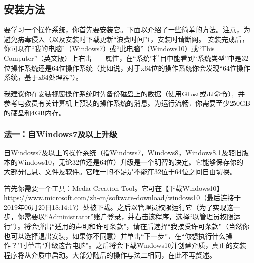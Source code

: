 \subsection{安装方法}
要学习一个操作系统，你首先要安装它。下面以介绍了一些简单的方法。注意，为避免病毒侵入（以及安装时下载更新“浪费时间”），安装时请断网。
安装完成后，你可以在“我的电脑”（Windows7）或“此电脑”（Windows10）或“This Computer”（英文版）上右击——属性，在“系统”栏目中能看到“系统类型”中是32位操作系统还是64位操作系统（比如说，对于x64位的操作系统你会发现“64位操作系统，基于x64处理器”）。
\begin{center} \bf \large {\color{red}{警告！即使使用微软提供的映像，第三方安装工具也可能会向计算机注入病毒或安装用户不需要的软件！因此请尽量不要使用非官方的工具来安装系统！}}\end{center}\par
我建议你在安装视窗操作系统时先备份磁盘上的数据（使用Ghost或dd命令），并参考电教员有关计算机上预装的操作系统的消息。为运行流畅，你需要至少250GB的硬盘和4GB内存。
\subsubsection{法一：自Windows7及以上升级}
自Windows7及以上的操作系统（指Windows7，Windows8，Windows8.1及较旧版本的Windows10，无论32位还是64位）升级是一个明智的决定。它能够保存你的大部分信息、文件及软件。它唯一的不足是不能在32位于64位之间自由切换。\par
首先你需要一个工具：Media Creation Tool。它可在【下载Windows10】\url{https://www.microsoft.com/zh-cn/software-download/windows10}（最后连接于2019年06月20日18:14:17）处被下载。之后以管理员权限运行它（为了实现这一步，你需要以“Administrator”账户登录，并右击该程序，选择“以管理员权限运行”）。将会弹出“适用的声明和许可条款”，请在{\color{red}{仔细阅读}}后选择“我接受许可条款”（当然你也可以选择退出安装，如果你不同意）并单击“下一步”，在“你想执行什么操作？”时单击“升级这台电脑”。之后将会下载Windows10并创建介质，真正的安装程序将从介质中启动。大部分随后的操作与法二相同，在此不再赘述。
